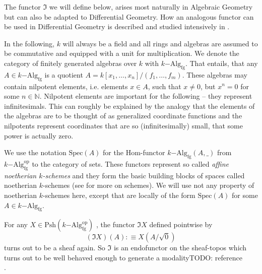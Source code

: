 \documentclass[9pt,twosided]{amsart}
\newcommand{\bN}{\mathbb N}
\newcommand{\Spec}{\ensuremath{\mathrm{Spec}}}
\newcommand{\fgkAlg}{\ensuremath{k\mathrm{-Alg}_{\mathrm{fg}}}}
\newcommand{\todo}[1]{{\color{red}TODO: #1 \\}}
\begin{document}
The functor $\Im$ we will define below, arises most naturally in Algebraic Geometry but can also be adapted to Differential Geometry.
How an analogous functor can be used in Differential Geometry is described and studied intensively in \cite{SyntheticPDEs}.

In the following, $k$ will always be a field and all rings and algebras are assumed to be commutative and equipped with a unit for multiplication.
We denote the category of finitely generated algebras over $k$ with $k\mathrm{-Alg}_{\mathrm{fg}}$.
That entails, that any $A\in k\mathrm{-Alg}_{\mathrm{fg}}$ is a quotient $A=k[x_1,\dots,x_n]/(f_1,\dots,f_m)$.
These algebras may contain nilpotent elements, i.e. elements $x\in A$, such that $x\neq 0$, but $x^n=0$ for some $n\in\bN$.
Nilpotent elements are important for the following -- they represent infinitesimals.
This can roughly be explained by the analogy
that the elements of the algebras are to be thought of as generalized coordinate functions
and the nilpotents represent coordinates that are so (infinitesimally) small, that some power is actually zero. 

We use the notation $\Spec(A)$ for the Hom-functor $k\mathrm{-Alg}_{\mathrm{fg}}(A,\_)$ from $k\mathrm{-Alg}^{\mathrm{op}}_{\mathrm{fg}}$ to the category of sets.
These functors represent so called \emph{affine noetherian $k$-schemes} and they form the basic building blocks of spaces called noetherian $k$-schemes
(see \cite[Chapter II]{hartshorne} for more on schemes).
We will use not any property of noetherian $k$-schemes here, except that are locally of the form $\Spec(A)$ for some $A\in\fgkAlg$.

For any $X\in\mathrm{Psh}(k\mathrm{-Alg}^\mathrm{op}_{\mathrm{fg}})$ ,
the functor $\Im X$ defined pointwise by
\[ (\Im X)(A):\equiv X(A/\sqrt{0})\]
turns out to be a sheaf again. So $\Im$ is an endofunctor on the sheaf-topos which turns out to be well behaved enough to generate a modality\todo{reference}.
\end{document}
